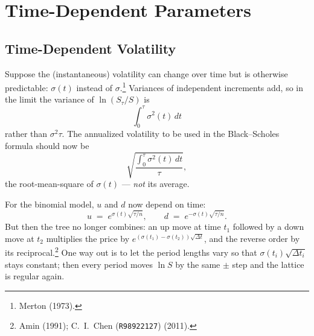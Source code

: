 \section{Time-Dependent Parameters}
\label{sec:time-dependent}

\subsection{Time-Dependent Volatility}


Suppose the (instantaneous) volatility can change over time but is otherwise predictable: $\sigma(t)$ instead of $\sigma$.\footnote{Merton (1973).}
Variances of independent increments add, so in the limit the variance of $\ln(S_{\tau}/S)$ is
\[
	\int_{0}^{\tau}\sigma^{2}(t)\,dt
\]
rather than $\sigma^{2}\tau$.
The annualized volatility to be used in the Black--Scholes formula should now be
\[
	\sqrt{\frac{\int_{0}^{\tau}\sigma^{2}(t)\,dt}{\tau}} ,
\]
\suppstart
the root-mean-square of $\sigma(t)$ --- \emph{not} its average.
\suppend

For the binomial model, $u$ and $d$ now depend on time:
\[
	u \;=\; e^{\sigma(t)\sqrt{\tau/n}} ,
	\qquad
	d \;=\; e^{-\sigma(t)\sqrt{\tau/n}} .
\]
But then the tree no longer combines: an up move at time $t_{1}$ followed by a down move at $t_{2}$ multiplies the price by $e^{(\sigma(t_{1})-\sigma(t_{2}))\sqrt{\Delta t}}$, and the reverse order by its reciprocal.\footnote{Amin (1991); C.~I.~Chen (\texttt{R98922127}) (2011).}
\suppstart
One way out is to let the period lengths vary so that $\sigma(t_{i})\sqrt{\Delta t_{i}}$ stays constant; then every period moves $\ln S$ by the same $\pm$ step and the lattice is regular again.

